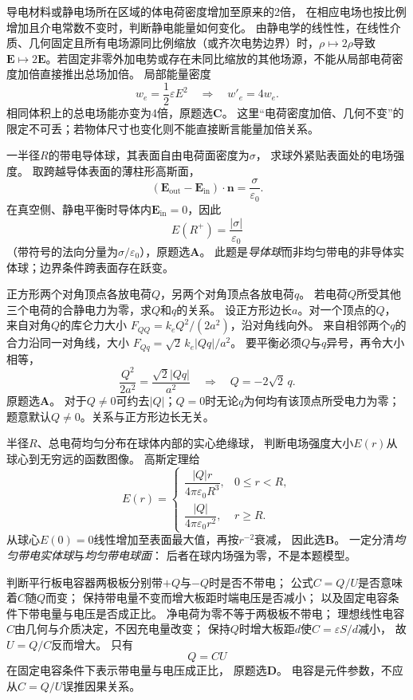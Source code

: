 \problemtext 导电材料或静电场所在区域的体电荷密度增加至原来的2倍，
在相应电场也按比例增加且介电常数不变时，判断静电能量如何变化。
\workings
由静电学的线性性，在线性介质、几何固定且所有电场源同比例缩放（或齐次电势边界）时，$\rho\mapsto2\rho$导致$\bm E\mapsto2\bm E$。若固定非零外加电势或存在未同比缩放的其他场源，不能从局部电荷密度加倍直接推出总场加倍。
局部能量密度
\[
w_e=\frac12\varepsilon E^2
\quad\Longrightarrow\quad
\boxed{w'_e=4w_e}.
\]
相同体积上的总电场能亦变为4倍，原题选\textbf{C}。
\crosscheck 这里“电荷密度加倍、几何不变”的限定不可丢；若物体尺寸也变化则不能直接断言能量加倍关系。

\problemtext 一半径$R$的带电导体球，其表面自由电荷面密度为$\sigma$，
求球外紧贴表面处的电场强度。
\workings
取跨越导体表面的薄柱形高斯面，
\[
(\bm E_{\mathrm{out}}-\bm E_{\mathrm{in}})\cdot\bm n
=\frac{\sigma}{\varepsilon_0}.
\]
在真空侧、静电平衡时导体内$\bm E_{\mathrm{in}}=0$，因此
\[
\boxed{E(R^+)=\frac{|\sigma|}{\varepsilon_0}}
\]
（带符号的法向分量为$\sigma/\varepsilon_0$），原题选\textbf{A}。
\crosscheck 此题是\emph{导体球}而非均匀带电的非导体实体球；边界条件跨表面存在跃变。

\problemtext 正方形两个对角顶点各放电荷$Q$，另两个对角顶点各放电荷$q$。
若电荷$Q$所受其他三个电荷的合静电力为零，求$Q$和$q$的关系。
\workings
设正方形边长$a$。对一个顶点的$Q$，
来自对角$Q$的库仑力大小
$F_{QQ}=k_eQ^2/(2a^2)$，沿对角线向外。
来自相邻两个$q$的合力沿同一对角线，大小
$F_{Qq}=\sqrt2\,k_e|Qq|/a^2$。
要平衡必须$Q$与$q$异号，再令大小相等，
\[
\frac{Q^2}{2a^2}=\frac{\sqrt2|Qq|}{a^2}
\quad\Longrightarrow\quad
\boxed{Q=-2\sqrt2\,q}.
\]
原题选\textbf{A}。
\crosscheck 对于$Q\ne0$可约去$|Q|$；$Q=0$时无论$q$为何均有该顶点所受电力为零；题意默认$Q\ne0$。关系与正方形边长无关。

\problemtext 半径$R$、总电荷均匀分布在球体内部的实心绝缘球，
判断电场强度大小$E(r)$从球心到无穷远的函数图像。
\workings
高斯定理给
\[
E(r)=
\begin{cases}
\dfrac{|Q|r}{4\pi\varepsilon_0 R^3},&0\le r<R,\\[3pt]
\dfrac{|Q|}{4\pi\varepsilon_0r^2},&r\ge R.
\end{cases}
\]
从球心$E(0)=0$线性增加至表面最大值，再按$r^{-2}$衰减，
因此选\textbf{B}。
\crosscheck 一定分清\emph{均匀带电实体球}与\emph{均匀带电球面}：
后者在球内场强为零，不是本题模型。

\problemtext 判断平行板电容器两极板分别带$+Q$与$-Q$时是否不带电；
公式$C=Q/U$是否意味着$C$随$Q$而变；
保持带电量不变而增大板距时端电压是否减小；
以及固定电容条件下带电量与电压是否成正比。
\workings
净电荷为零不等于两极板不带电；
理想线性电容$C$由几何与介质决定，不因充电量改变；
保持$Q$时增大板距$d$使$C=\varepsilon S/d$减小，
故$U=Q/C$反而增大。
只有
\[
\boxed{Q=CU}
\]
在固定电容条件下表示带电量与电压成正比，
原题选\textbf{D}。
\crosscheck 电容是元件参数，不应从$C=Q/U$误推因果关系。

